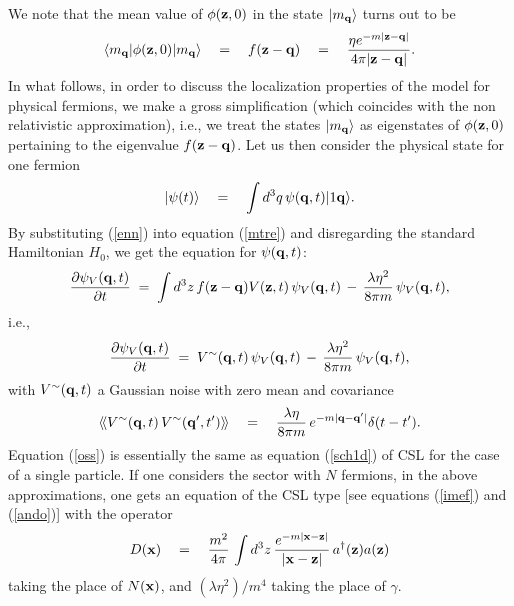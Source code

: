 \documentclass[10pt,a4paper]{article}
\newcommand{\llangle}{\langle\!\langle}
\newcommand{\rrangle}{\rangle\!\rangle}
\begin{document}
We note that the mean value of $\phi({\bf z}, 0)$ in the state
$|m_{\bf q}\rangle$ turns out to be
\begin{equation}
\langle m_{\bf q}| \phi({\bf z}, 0) |m_{\bf q}\rangle \quad =
\quad f({\bf z} - {\bf q}) \quad = \quad \frac{\eta e^{-m|{\bf z}
- {\bf q}|}}{4\pi |{\bf z} - {\bf q}|}.
\end{equation}
In what follows, in order to discuss the localization properties
of the model for physical fermions, we make a gross simplification
(which coincides with the non relativistic approximation), i.e.,
we treat the states $|m_{\bf q}\rangle$ as eigenstates of
$\phi({\bf z}, 0)$ pertaining to the eigenvalue $f({\bf z} - {\bf
q})$. Let us then consider the physical state for one fermion
\begin{equation} \label{enn}
|\psi(t)\rangle \quad = \quad \int d^{3}q\, \psi({\bf q}, t)
|1{\bf q}\rangle.
\end{equation}
By substituting (\ref{enn}) into equation (\ref{mtre}) and
disregarding the standard Hamiltonian $H_{0}$, we get the equation
for $\psi({\bf q}, t)$:
\begin{equation} \label{pmse}
\frac{\partial \psi_{V}({\bf q}, t)}{\partial t} \;  = \; \int
d^{3}z\, f({\bf z} - {\bf q}) V({\bf z}, t)\, \psi_{V}({\bf q},
t)\, - \, \frac{\lambda \eta^{2}}{8\pi m}\, \psi_{V}({\bf q}, t),
\end{equation}
i.e.,
\begin{equation} \label{oss}
\frac{\partial \psi_{V}({\bf q}, t)}{\partial t} \;  = \;
V^{\sim}({\bf q}, t)\, \psi_{V}({\bf q}, t)\, - \, \frac{\lambda
\eta^{2}}{8\pi m}\, \psi_{V}({\bf q}, t),
\end{equation}
with $V^{\sim}({\bf q}, t)$ a Gaussian noise with zero mean and
covariance
\begin{equation}
\llangle V^{\sim}({\bf q}, t)\, V^{\sim}({\bf q}', t') \rrangle
\quad = \quad \frac{\lambda\eta}{8\pi m}\, e^{-m|{\bf q} - {\bf
q}'|} \delta(t-t').
\end{equation}
Equation (\ref{oss}) is essentially the same as equation
(\ref{sch1d}) of CSL for the case of a single particle. If one
considers the sector with $N$ fermions, in the above
approximations, one gets an equation of the CSL type [see
equations (\ref{imef}) and (\ref{ando})] with the operator
\begin{equation} \label{ndor}
D({\bf x}) \quad = \quad \frac{m^{2}}{4\pi}\,\int d^{3}z\,
\frac{e^{-m|{\bf x} - {\bf z}|}}{|{\bf x} - {\bf z}|}\,
a^{\dagger}({\bf z}) a({\bf z})
\end{equation}
taking the place of $N({\bf x})$, and $(\lambda\eta^{2})/m^{4}$
taking the place of $\gamma$.
\end{document}
